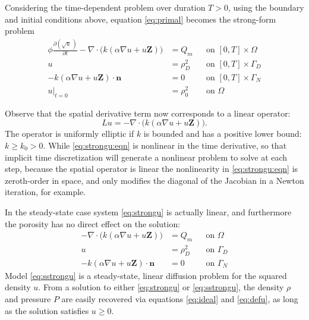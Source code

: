 \documentclass[11pt]{amsart}
\newcommand{\bn}{\mathbf{n}}
\newcommand{\bZ}{\mathbf{Z}}
\newcommand{\Div}{\nabla\cdot}
\newcommand{\grad}{\nabla}
\begin{document}
Considering the time-dependent problem over duration $T>0$, using the boundary and initial conditions above, equation \eqref{eq:primal} becomes the strong-form problem
\begin{subequations}
\label{eq:strongu}
\begin{align}
\phi \frac{\partial(\sqrt{u}\,)}{\partial t} - \Div\Big(k \left(\alpha\grad u + u \bZ\right)\Big) &= Q_m & &\text{on } [0,T]\times \Omega \label{eq:strongu:eqn} \\
u &= \rho_D^2 & &\text{on } [0,T]\times \Gamma_D  \label{eq:strongu:bcD} \\
-k\left(\alpha\grad u + u \bZ\right) \cdot \bn &= 0 & &\text{on } [0,T]\times \Gamma_N  \label{eq:strongu:bcN} \\
u\big|_{t=0} &= \rho_0^2 & &\text{on } \Omega  \label{eq:strongu:initial}
\end{align}
\end{subequations}

Observe that the spatial derivative term now corresponds to a linear operator:
\begin{equation}
L u = - \Div\Big(k \left(\alpha\grad u + u \bZ\right)\Big).
\end{equation}
The operator is uniformly elliptic if $k$ is bounded and has a positive lower bound: $k \ge k_0 > 0$.  While \eqref{eq:strongu:eqn} is nonlinear in the time derivative, so that implicit time discretization will generate a nonlinear problem to solve at each step, because the spatial operator is linear the nonlinearity in \eqref{eq:strongu:eqn} is zeroth-order in space, and only modifies the diagonal of the Jacobian in a Newton iteration, for example.

In the steady-state case system \eqref{eq:strongu} is actually linear, and furthermore the porosity has no direct effect on the solution:
\begin{subequations}
\label{eq:sstrongu}
\begin{align}
- \Div\Big(k \left(\alpha\grad u + u \bZ\right)\Big) &= Q_m & &\text{on } \Omega \label{eq:sstrongu:eqn} \\
u &= \rho_D^2 & &\text{on } \Gamma_D  \label{eq:sstrongu:bcD} \\
-k\left(\alpha\grad u + u \bZ\right) \cdot \bn &= 0 & &\text{on } \Gamma_N  \label{eq:sstrongu:bcN}
\end{align}
\end{subequations}
Model \eqref{eq:sstrongu} is a steady-state, linear diffusion problem for the squared density $u$.  From a solution to either \eqref{eq:strongu} or \eqref{eq:sstrongu}, the density $\rho$ and pressure $P$ are easily recovered via equations \eqref{eq:ideal} and \eqref{eq:defu}, as long as the solution satisfies $u\ge 0$.
\end{document}
